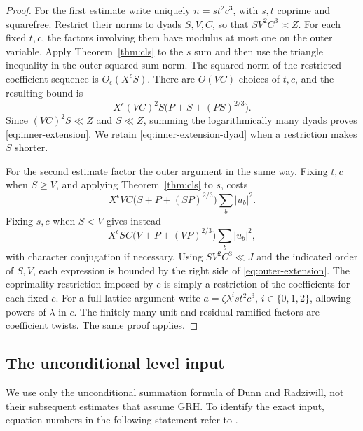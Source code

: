 \begin{proof}
For the first estimate write uniquely $n=s t^2 c^3$, with $s,t$
coprime and squarefree. Restrict their norms to dyads $S,V,C$, so that
$SV^2C^3\asymp Z$.
For each fixed $t,c$, the factors involving them have modulus at most
one on the outer variable. Apply Theorem~\ref{thm:cls} to the $s$ sum
and then use the triangle inequality in the outer squared-sum norm.
The squared norm of the restricted coefficient sequence is
$O_\epsilon(X^\epsilon S)$.
There are $O(VC)$ choices of $t,c$, and the resulting bound is
\begin{equation}
 X^\epsilon (VC)^2S
       \bigl(P+S+(PS)^{2/3}\bigr).
 \label{eq:inner-extension-dyad}
\end{equation}
Since $(VC)^2S\ll Z$ and $S\ll Z$, summing the logarithmically many
dyads proves \eqref{eq:inner-extension}. We retain
\eqref{eq:inner-extension-dyad} when a restriction makes $S$ shorter.

For the second estimate factor the outer argument in the same way.
Fixing $t,c$ when $S\ge V$, and applying Theorem~\ref{thm:cls} to $s$,
costs
\[
 X^\epsilon VC\bigl(S+P+(SP)^{2/3}\bigr)\sum_b|u_b|^2.
\]
Fixing $s,c$ when $S<V$ gives instead
\[
 X^\epsilon SC\bigl(V+P+(VP)^{2/3}\bigr)\sum_b|u_b|^2,
\]
with character conjugation if necessary.
Using $SV^2C^3\ll J$ and the indicated order of $S,V$, each expression
is bounded by the right side of \eqref{eq:outer-extension}.
The coprimality restriction imposed by $c$ is simply a restriction of
the coefficients for each fixed $c$.
For a full-lattice argument write
$a=\zeta\lambda^i s t^2 c^3$, $i\in\{0,1,2\}$, allowing powers of
$\lambda$ in $c$. The finitely many unit and residual ramified factors
are coefficient twists. The same proof applies.
\end{proof}

\subsection{The unconditional level input}

We use only the unconditional summation formula of Dunn and Radziwill,
not their subsequent estimates that assume GRH. To identify the exact
input, equation numbers in the following statement refer to
\cite[arXiv version 3, Proposition 5.3]{DR2024}.

